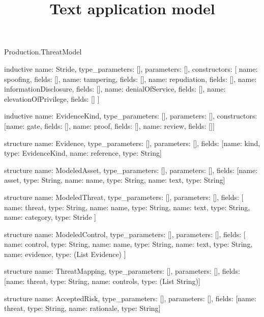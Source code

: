 \begin{lexlean}{Production.ThreatModel}
\title{Text application model}
\begin{semanticmodule}
inductive{
  name: Stride,
  type_parameters: [],
  parameters: [],
  constructors: [
    {name: spoofing, fields: []},
    {name: tampering, fields: []},
    {name: repudiation, fields: []},
    {name: informationDisclosure, fields: []},
    {name: denialOfService, fields: []},
    {name: elevationOfPrivilege, fields: []}
  ]
}

inductive{
  name: EvidenceKind,
  type_parameters: [],
  parameters: [],
  constructors: [{name: gate, fields: []}, {name: proof, fields: []}, {name: review, fields: []}]
}

structure{
  name: Evidence,
  type_parameters: [],
  parameters: [],
  fields: [{name: kind, type: EvidenceKind}, {name: reference, type: String}]
}

structure{
  name: ModeledAsset,
  type_parameters: [],
  parameters: [],
  fields: [{name: asset, type: String}, {name: name, type: String}, {name: text, type: String}]
}

structure{
  name: ModeledThreat,
  type_parameters: [],
  parameters: [],
  fields: [
    {name: threat, type: String},
    {name: name, type: String},
    {name: text, type: String},
    {name: category, type: Stride}
  ]
}

structure{
  name: ModeledControl,
  type_parameters: [],
  parameters: [],
  fields: [
    {name: control, type: String},
    {name: name, type: String},
    {name: text, type: String},
    {name: evidence, type: (List Evidence)}
  ]
}

structure{
  name: ThreatMapping,
  type_parameters: [],
  parameters: [],
  fields: [{name: threat, type: String}, {name: controls, type: (List String)}]
}

structure{
  name: AcceptedRisk,
  type_parameters: [],
  parameters: [],
  fields: [{name: threat, type: String}, {name: rationale, type: String}]
}
\end{semanticmodule}
\end{lexlean}
